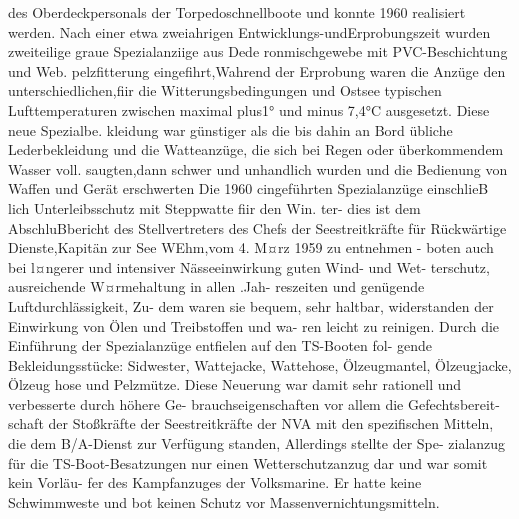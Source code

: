 des Oberdeckpersonals der Torpedoschnellboote
und konnte 1960 realisiert werden. Nach einer etwa
zweiahrigen Entwicklungs-undErprobungszeit
wurden zweiteilige graue Spezialanziige aus Dede
ronmischgewebe mit PVC-Beschichtung und Web.
pelzfitterung eingefihrt,Wahrend der Erprobung
waren die Anzüge den unterschiedlichen,fiir die
Witterungsbedingungen und
Ostsee typischen
Lufttemperaturen zwischen maximal plus1°
und minus 7,4°C ausgesetzt. Diese neue Spezialbe.
kleidung war günstiger als die bis dahin an Bord
übliche Lederbekleidung und die Watteanzüge, die
sich bei Regen oder überkommendem Wasser voll.
saugten,dann schwer und unhandlich wurden und
die Bedienung von Waffen und Gerät erschwerten
Die 1960 cingeführten Spezialanzüge einschlieB
lich Unterleibsschutz mit Steppwatte fiir den Win.
ter- dies ist dem AbschluBbericht des Stellvertreters des Chefs der Seestreitkräfte für Rückwärtige
Dienste,Kapitän zur See WEhm,vom 4. M¤rz
1959 zu entnehmen - boten auch bei l¤ngerer und
intensiver Nässeeinwirkung guten Wind- und Wet-
terschutz, ausreichende W¤rmehaltung in allen .Jah-
reszeiten und genügende Luftdurchlässigkeit, Zu-
dem waren sie bequem, sehr haltbar, widerstanden
der Einwirkung von Ölen und Treibstoffen und wa-
ren leicht zu reinigen. Durch die Einführung der
Spezialanzüge entfielen auf den TS-Booten fol-
gende Bekleidungsstücke: Sidwester, Wattejacke,
Wattehose, Ölzeugmantel, Ölzeugjacke, Ölzeug
hose und Pelzmütze. Diese Neuerung war damit
sehr rationell und verbesserte durch höhere Ge-
brauchseigenschaften vor allem die Gefechtsbereit-
schaft der Stoßkräfte der Seestreitkräfte der NVA
mit den spezifischen Mitteln, die dem B/A-Dienst
zur Verfügung standen, Allerdings stellte der Spe-
zialanzug für die TS-Boot-Besatzungen nur einen
Wetterschutzanzug dar und war somit kein Vorläu-
fer des Kampfanzuges der Volksmarine. Er hatte
keine Schwimmweste und bot keinen Schutz vor
Massenvernichtungsmitteln.